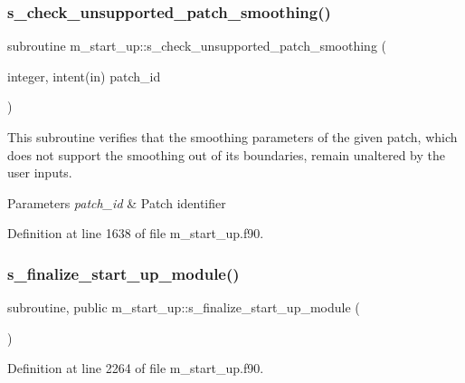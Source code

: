 \subsubsection{\texorpdfstring{s\+\_\+check\+\_\+unsupported\+\_\+patch\+\_\+smoothing()}{s\_check\_unsupported\_patch\_smoothing()}}
{\footnotesize\ttfamily subroutine m\+\_\+start\+\_\+up\+::s\+\_\+check\+\_\+unsupported\+\_\+patch\+\_\+smoothing (\begin{DoxyParamCaption}\item[{integer, intent(in)}]{patch\+\_\+id }\end{DoxyParamCaption})}



This subroutine verifies that the smoothing parameters of the given patch, which does not support the smoothing out of its boundaries, remain unaltered by the user inputs. 


\begin{DoxyParams}{Parameters}
{\em patch\+\_\+id} & Patch identifier \\
\hline
\end{DoxyParams}


Definition at line 1638 of file m\+\_\+start\+\_\+up.\+f90.

\mbox{\label{namespacem__start__up_a65fd279db64882a3732a0549ec74e335}} 
\subsubsection{\texorpdfstring{s\+\_\+finalize\+\_\+start\+\_\+up\+\_\+module()}{s\_finalize\_start\_up\_module()}}
{\footnotesize\ttfamily subroutine, public m\+\_\+start\+\_\+up\+::s\+\_\+finalize\+\_\+start\+\_\+up\+\_\+module (\begin{DoxyParamCaption}{ }\end{DoxyParamCaption})}



Definition at line 2264 of file m\+\_\+start\+\_\+up.\+f90.

\mbox{\label{namespacem__start__up_a37202711d89d04cd18f08170ba608aa1}} 
